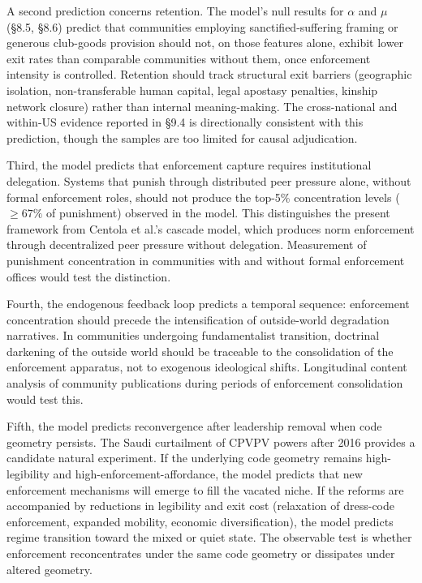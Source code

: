 \documentclass[12pt]{article}
\begin{document}
A second prediction concerns retention. The model's null results for $\alpha$ and $\mu$ (\S8.5, \S8.6) predict that communities employing sanctified-suffering framing or generous club-goods provision should not, on those features alone, exhibit lower exit rates than comparable communities without them, once enforcement intensity is controlled. Retention should track structural exit barriers (geographic isolation, non-transferable human capital, legal apostasy penalties, kinship network closure) rather than internal meaning-making. The cross-national and within-US evidence reported in \S9.4 is directionally consistent with this prediction, though the samples are too limited for causal adjudication.

Third, the model predicts that enforcement capture requires institutional delegation. Systems that punish through distributed peer pressure alone, without formal enforcement roles, should not produce the top-5\% concentration levels ($\geq 67\%$ of punishment) observed in the model. This distinguishes the present framework from Centola et al.'s cascade model, which produces norm enforcement through decentralized peer pressure without delegation. Measurement of punishment concentration in communities with and without formal enforcement offices would test the distinction.

Fourth, the endogenous feedback loop predicts a temporal sequence: enforcement concentration should precede the intensification of outside-world degradation narratives. In communities undergoing fundamentalist transition, doctrinal darkening of the outside world should be traceable to the consolidation of the enforcement apparatus, not to exogenous ideological shifts. Longitudinal content analysis of community publications during periods of enforcement consolidation would test this.

Fifth, the model predicts reconvergence after leadership removal when code geometry persists. The Saudi curtailment of CPVPV powers after 2016 provides a candidate natural experiment. If the underlying code geometry remains high-legibility and high-enforcement-affordance, the model predicts that new enforcement mechanisms will emerge to fill the vacated niche. If the reforms are accompanied by reductions in legibility and exit cost (relaxation of dress-code enforcement, expanded mobility, economic diversification), the model predicts regime transition toward the mixed or quiet state. The observable test is whether enforcement reconcentrates under the same code geometry or dissipates under altered geometry.
\end{document}
